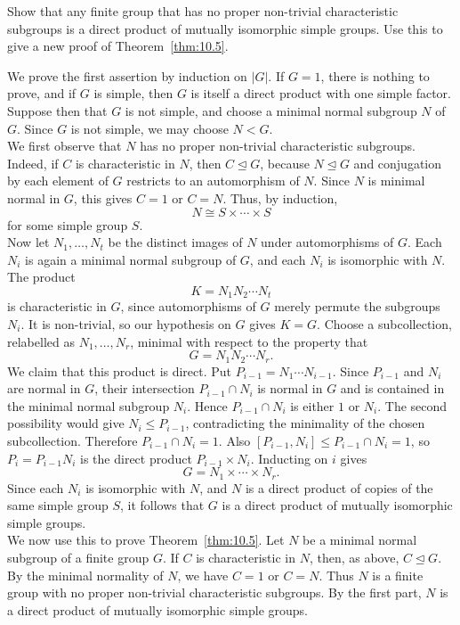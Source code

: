 \documentclass[../Odyssey_Project.tex]{subfiles}
\begin{document}
\begin{exercise}
\label{ex:10.8}
Show that any finite group that has no proper non-trivial characteristic subgroups is a direct product of mutually isomorphic simple groups. Use this to give a new proof of Theorem~\ref{thm:10.5}.
\end{exercise}
\begin{solution}
We prove the first assertion by induction on $\lvert G\rvert$. If $G=1$, there is nothing to prove, and if $G$ is simple, then $G$ is itself a direct product with one simple factor. Suppose then that $G$ is not simple, and choose a minimal normal subgroup $N$ of $G$. Since $G$ is not simple, we may choose $N<G$.\\
We first observe that $N$ has no proper non-trivial characteristic subgroups. Indeed, if $C$ is characteristic in $N$, then $C\trianglelefteq G$, because $N\trianglelefteq G$ and conjugation by each element of $G$ restricts to an automorphism of $N$. Since $N$ is minimal normal in $G$, this gives $C=1$ or $C=N$. Thus, by induction,
\[
  N\cong S\times\cdots\times S
\]
for some simple group $S$.\\
Now let $N_1,\dots,N_t$ be the distinct images of $N$ under automorphisms of $G$. Each $N_i$ is again a minimal normal subgroup of $G$, and each $N_i$ is isomorphic with $N$. The product
\[
  K=N_1N_2\cdots N_t
\]
is characteristic in $G$, since automorphisms of $G$ merely permute the subgroups $N_i$. It is non-trivial, so our hypothesis on $G$ gives $K=G$. Choose a subcollection, relabelled as $N_1,\dots,N_r$, minimal with respect to the property that
\[
  G=N_1N_2\cdots N_r.
\]
We claim that this product is direct. Put $P_{i-1}=N_1\cdots N_{i-1}$. Since $P_{i-1}$ and $N_i$ are normal in $G$, their intersection $P_{i-1}\cap N_i$ is normal in $G$ and is contained in the minimal normal subgroup $N_i$. Hence $P_{i-1}\cap N_i$ is either $1$ or $N_i$. The second possibility would give $N_i\leq P_{i-1}$, contradicting the minimality of the chosen subcollection. Therefore $P_{i-1}\cap N_i=1$. Also $[P_{i-1},N_i]\leq P_{i-1}\cap N_i=1$, so $P_i=P_{i-1}N_i$ is the direct product $P_{i-1}\times N_i$. Inducting on $i$ gives
\[
  G=N_1\times\cdots\times N_r.
\]
Since each $N_i$ is isomorphic with $N$, and $N$ is a direct product of copies of the same simple group $S$, it follows that $G$ is a direct product of mutually isomorphic simple groups.\\
We now use this to prove Theorem~\ref{thm:10.5}. Let $N$ be a minimal normal subgroup of a finite group $G$. If $C$ is characteristic in $N$, then, as above, $C\trianglelefteq G$. By the minimal normality of $N$, we have $C=1$ or $C=N$. Thus $N$ is a finite group with no proper non-trivial characteristic subgroups. By the first part, $N$ is a direct product of mutually isomorphic simple groups.
\end{solution}
\end{document}
